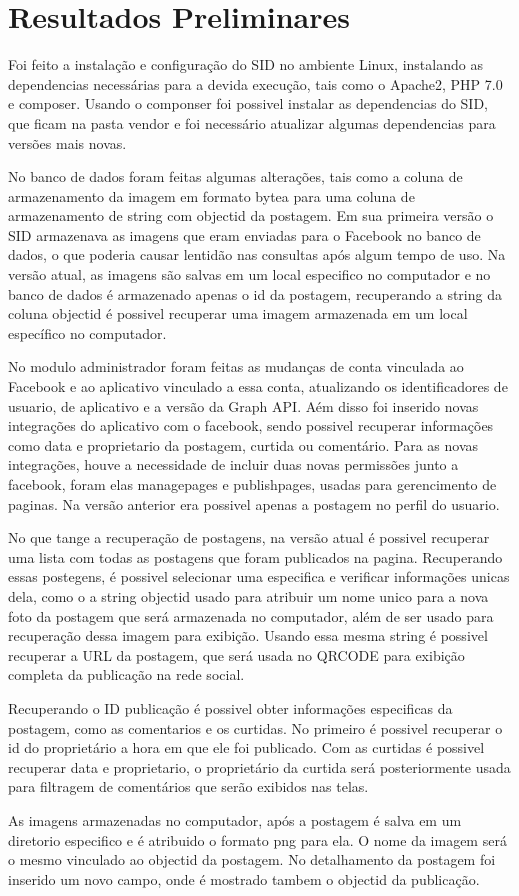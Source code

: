 \chapter[Resultados Preliminares]{Resultados Preliminares}
Foi feito a instalação e configuração do SID no ambiente Linux, instalando as dependencias necessárias para a devida execução, tais como o Apache2, PHP 7.0 e composer. Usando o componser foi possivel instalar as dependencias do SID, que ficam na pasta vendor e foi necessário atualizar algumas dependencias para versões mais novas.

No banco de dados foram feitas algumas alterações, tais como a coluna de armazenamento da imagem em formato bytea para uma coluna de armazenamento de string com object\textunderscore{}id da postagem. Em sua primeira versão o SID armazenava as imagens que eram enviadas para o Facebook no banco de dados, o que poderia causar lentidão nas consultas após algum tempo de uso. Na versão atual, as imagens são salvas em um local especifico no computador e no banco de dados é armazenado apenas o id da postagem, recuperando a string da coluna object\textunderscore{}id é possivel recuperar uma imagem armazenada em um local específico no computador.

No modulo administrador foram feitas as mudanças de conta vinculada ao Facebook e ao aplicativo vinculado a essa conta, atualizando os identificadores de usuario, de aplicativo e a versão da Graph API. Aém disso foi inserido novas integrações do aplicativo com o facebook, sendo possivel recuperar informações como data e proprietario da postagem, curtida ou comentário. Para as novas integrações, houve a necessidade de incluir duas novas permissões junto a facebook, foram elas manage\textunderscore{}pages e publish\textunderscore{}pages, usadas para gerencimento de paginas. Na versão anterior era possivel apenas a postagem no perfil do usuario.

No que tange a recuperação de postagens, na versão atual é possivel recuperar uma lista com todas as postagens que foram publicados na pagina. Recuperando essas postegens, é possivel selecionar uma especifica e verificar informações unicas dela, como o a string object\textunderscore{}id usado para atribuir um nome unico para a nova foto da postagem que será armazenada no computador, além de ser usado para recuperação dessa imagem para exibição. Usando essa mesma string é possivel recuperar a URL da postagem, que será usada no QRCODE para exibição completa da publicação na rede social.

Recuperando o ID publicação é possivel obter  informações especificas da postagem, como as comentarios e os curtidas. No primeiro é possivel recuperar o id do proprietário a hora em que ele foi publicado. Com as curtidas é possivel recuperar data e proprietario, o proprietário da curtida será posteriormente usada para filtragem de comentários que serão exibidos nas telas. 

As imagens armazenadas no computador, após a postagem é salva em um diretorio especifico e é atribuido o formato png para ela. O nome da imagem será o mesmo vinculado ao object\textunderscore{}id da postagem. No detalhamento da postagem foi inserido um novo campo, onde é mostrado tambem o object\textunderscore{}id da publicação.